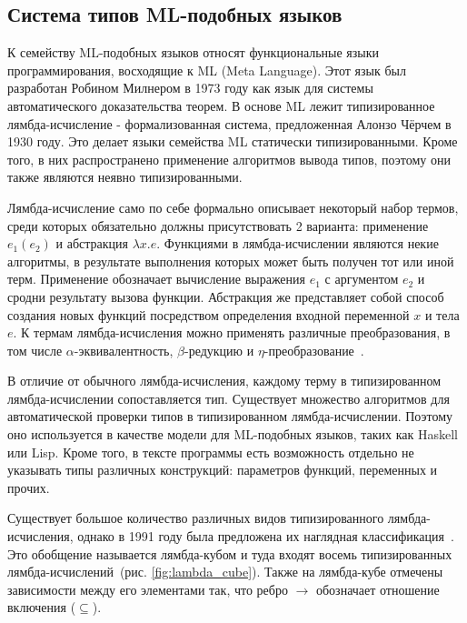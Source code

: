 \subsection{Система типов ML-подобных языков}
\label{subsec:ml_type_system}



К семейству ML-подобных языков относят функциональные языки программирования, восходящие к ML (Meta Language).
Этот язык был разработан Робином Милнером в 1973 году как язык для системы автоматического доказательства теорем.
В основе ML лежит типизированное лямбда-исчисление - формализованная система, предложенная Алонзо Чёрчем в 1930 году.
Это делает языки семейства ML статически типизированными.
Кроме того, в них распространено применение алгоритмов вывода типов, поэтому они также являются неявно типизированными.


Лямбда-исчисление само по себе формально описывает некоторый набор термов, среди которых обязательно должны присутствовать 2 варианта: применение $e_1(e_2)$ и абстракция $\lambda x. e$.
Функциями в лямбда-исчислении являются некие алгоритмы, в результате выполнения которых может быть получен тот или иной терм.
Применение обозначает вычисление выражения $e_1$ с аргументом $e_2$ и сродни результату вызова функции.
Абстракция же представляет собой способ создания новых функций посредством определения входной переменной $x$ и тела $e$.
К термам лямбда-исчисления можно применять различные преобразования, в том числе $\alpha$-эквивалентность, $\beta$-редукцию и $\eta$-преобразование~\cite{LambdaCalculus}.

В отличие от обычного лямбда-исчисления, каждому терму в типизированном лямбда-исчислении сопоставляется тип.
Существует множество алгоритмов для автоматической проверки типов в типизированном лямбда-исчислении.
Поэтому оно используется в качестве модели для ML-подобных языков, таких как Haskell или Lisp.
Кроме того, в тексте программы есть возможность отдельно не указывать типы различных конструкций: параметров функций, переменных и прочих.

Существует большое количество различных видов типизированного лямбда-исчисления, однако в 1991 году была предложена их наглядная классификация~\cite{LambdaCalculusWithTypes}.
Это обобщение называется лямбда-кубом и туда входят восемь типизированных лямбда-исчислений~(рис. \ref{fig:lambda_cube}).
Также на лямбда-кубе отмечены зависимости между его элементами так, что ребро $\to$ обозначает отношение включения ($\subseteq$).

